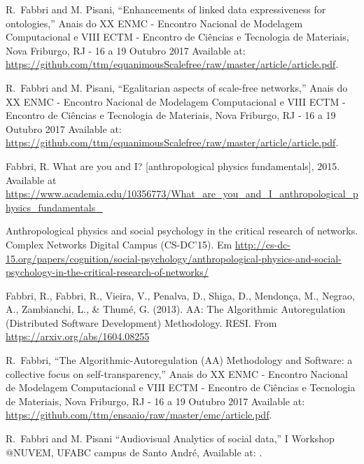 \documentclass[letterpaper,10pt]{article}
\begin{document}
\begin{thebibliography}{99}
  R.~Fabbri and M. Pisani,
  ``Enhancements of linked data expressiveness for ontologies,''
  Anais do XX ENMC - Encontro Nacional de Modelagem Computacional e
  VIII ECTM - Encontro de Ci\^encias e Tecnologia de Materiais, Nova Friburgo,
  RJ - 16 a 19 Outubro 2017
		Available at: \url{https://github.com/ttm/equanimousScalefree/raw/master/article/article.pdf}.

  R.~Fabbri and M. Pisani,
  ``Egalitarian aspects of scale-free networks,''
  Anais do XX ENMC - Encontro Nacional de Modelagem Computacional e
  VIII ECTM - Encontro de Ci\^encias e Tecnologia de Materiais, Nova Friburgo,
  RJ - 16 a 19 Outubro 2017
		Available at: \url{https://github.com/ttm/equanimousScalefree/raw/master/article/article.pdf}.

	Fabbri, R. What are you and I? [anthropological physics fundamentals], 2015. Available at \url{https://www.academia.edu/10356773/What\_are\_you\_and\_I\_anthropological\_physics\_fundamentals\_}

	Anthropological physics and social psychology in the critical research of networks. Complex Networks Digital Campus (CS-DC'15).
	Em \url{http://cs-dc-15.org/papers/cognition/social-psychology/anthropological-physics-and-social-psychology-in-the-critical-research-of-networks/}

	Fabbri, R., Fabbri, R., Vieira, V., Penalva, D., Shiga, D., Mendonça, M., Negrao, A., Zambianchi, L., \& Thumé, G. (2013). AA: The Algorithmic Autoregulation (Distributed Software Development) Methodology. RESI. From \url{https://arxiv.org/abs/1604.08255}

  R.~Fabbri,
  ``The Algorithmic-Autoregulation (AA) Methodology and Software: a collective focus on self-transparency,''
  Anais do XX ENMC - Encontro Nacional de Modelagem Computacional e
  VIII ECTM - Encontro de Ci\^encias e Tecnologia de Materiais, Nova Friburgo,
  RJ - 16 a 19 Outubro 2017
		Available at: \url{https://github.com/ttm/ensaaio/raw/master/emc/article.pdf}.

  R.~Fabbri and M. Pisani
  ``Audiovisual Analytics of social data,''
  I Workshop @NUVEM, UFABC campus de Santo André,
		Available at: \url{}.
\end{thebibliography}
\end{document}
